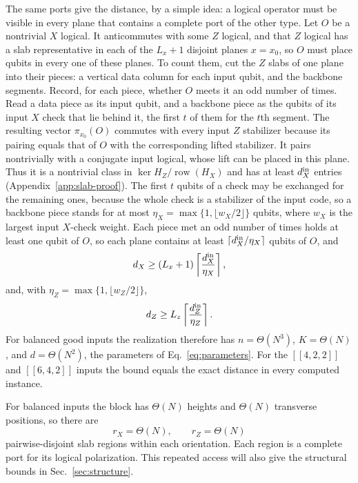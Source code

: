 The same ports give the distance, by a simple idea: a logical operator must
be visible in every plane that contains a complete port of the other type.
Let $O$ be a nontrivial $X$ logical.  It anticommutes with some $Z$ logical,
and that $Z$ logical has a slab representative in each of the $L_x+1$
disjoint planes $x=x_0$, so $O$ must place qubits in every one of these
planes.  To count them, cut the $Z$ slabs of one plane into their pieces: a
vertical data column for each input qubit, and the backbone segments.
Record, for each piece, whether $O$ meets it an odd number of times.  Read a
data piece as its input qubit, and a backbone piece as the qubits of its
input $X$ check that lie behind it, the first $t$ of them for the $t$th
segment.  The resulting vector $\pi_{x_0}(O)$ commutes with every input $Z$
stabilizer because its pairing equals that of $O$ with the corresponding
lifted stabilizer. It pairs nontrivially with a conjugate input logical,
whose lift can be placed in this plane. Thus it is a nontrivial class in
$\ker H_Z/\operatorname{row}(H_X)$ and has at least
$d_X^{\rm in}$ entries (Appendix~\ref{app:slab-proof}).  The first $t$ qubits of a
check may be exchanged for the remaining ones, because the whole check is a
stabilizer of the input code, so a backbone piece stands for at most
$\eta_X=\max\{1,\lfloor w_X/2\rfloor\}$ qubits, where $w_X$ is the largest
input $X$-check weight.  Each piece met an odd number of times holds at least
one qubit of $O$, so each plane contains at least
$\lceil d_X^{\rm in}/\eta_X\rceil$ qubits of $O$, and
\begin{equation}
 d_X\ge(L_x+1)\left\lceil\frac{d_X^{\rm in}}{\eta_X}\right\rceil,
 \label{eq:distance}
\end{equation}
and, with $\eta_Z=\max\{1,\lfloor w_Z/2\rfloor\}$,
\begin{equation}
 d_Z\ge L_z\left\lceil\frac{d_Z^{\rm in}}{\eta_Z}\right\rceil.
 \label{eq:distance-dual}
\end{equation}
For balanced good inputs the realization therefore has
$n=\Theta(N^3)$, $K=\Theta(N)$, and $d=\Theta(N^2)$, the parameters of
Eq.~\eqref{eq:parameters}.  For the $[[4,2,2]]$ and $[[6,4,2]]$
inputs the bound equals the exact distance in every computed instance.

For balanced inputs the block has $\Theta(N)$ heights and $\Theta(N)$
transverse positions, so there are
\begin{equation}
 r_X=\Theta(N),\qquad r_Z=\Theta(N)
 \label{eq:mobility}
\end{equation}
pairwise-disjoint slab regions within each orientation. Each region is a
complete port for its logical polarization. This repeated access will also
give the structural bounds in Sec.~\ref{sec:structure}.

